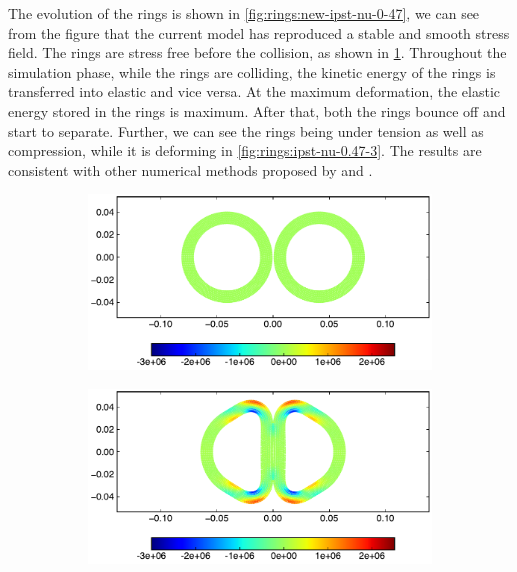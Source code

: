 The evolution of the rings is shown in \cref{fig:rings:new-ipst-nu-0-47}, we
can see from the figure that the current model has reproduced a stable and
smooth stress field. The rings are stress free before the collision, as shown
in \cref{fig:rings:ipst-nu-0.47-1}. Throughout the simulation phase, while the
rings are colliding, the kinetic energy of the rings is transferred into
elastic and vice versa. At the maximum deformation, the elastic energy stored
in the rings is maximum. After that, both the rings bounce off and start to
separate. Further, we can see the rings being under tension as well as
compression, while it is deforming in \cref{fig:rings:ipst-nu-0.47-3}. The
results are consistent with other numerical methods proposed by
\textcite{gray2001sph} and \textcite{zhang2017generalized}.
\begin{figure}[!htpb]
  \centering
  \begin{subfigure}{0.48\textwidth}
    \centering
    \includegraphics[width=1.0\textwidth]{figures/csph/figures/yan_2021_colliding_rubber_rings/poisson_ratio_0_47/time0}
    \label{fig:rings:ipst-nu-0.47-1}
  \end{subfigure}
  \begin{subfigure}{0.48\textwidth}
    \centering
    \includegraphics[width=1.0\textwidth]{figures/csph/figures/yan_2021_colliding_rubber_rings/poisson_ratio_0_47/time1}
    \label{fig:rings:ipst-nu-0.47-2}
  \end{subfigure}


\end{figure}
